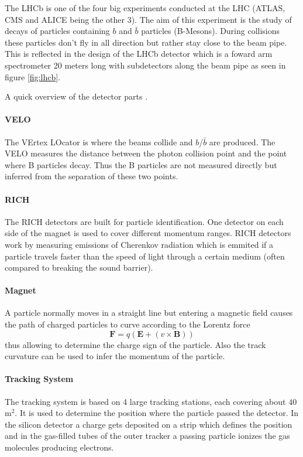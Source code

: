\documentclass[11pt,twoside]{scrreprt}
\begin{document}
The LHCb is one of the four big experiments conducted at the LHC (ATLAS, CMS and ALICE being the other 3). The aim of this experiment is the study of decays of particles containing $b$ and $\bar{b}$ particles (B-Mesons). During collisions these particles don't fly in all direction but rather stay close to the beam pipe. This is reflected in the design of the LHCb detector which is a foward arm spectrometer 20 meters long with subdetectors along the beam pipe as seen in figure \ref{fig:lhcb}.

A quick overview of the detector parts \parencite{lhcbweb}.

\paragraph{VELO} The VErtex LOcator is where the beams collide and $b$/$\bar{b}$ are produced. The VELO measures the distance between the photon collision point and the point where B particles decay. Thus the B particles are not measured directly but inferred from the separation of these two points.

\paragraph{RICH} The RICH detectors are built for particle identification. One detector on each side of the magnet is used to cover different momentum ranges. RICH detectors work by measuring emissions of Cherenkov radiation which is emmited if a particle travels faster than the speed of light through a certain medium (often compared to breaking the sound barrier).

\paragraph{Magnet} A particle normally moves in a straight line but entering a magnetic field causes the path of charged particles to curve according to the Lorentz force \[
  \mathbf{F} = q\left( \mathbf{E} + \left( v\times\mathbf{B}\right)\right)
\]
thus allowing to determine the charge sign of the particle. Also the track curvature can be used to infer the momentum of the particle.

\paragraph{Tracking System} The tracking system is based on 4 large tracking stations, each covering about $40$\,m$^2$. It is used to determine the position where the particle passed the detector. In the silicon detector a charge gets deposited on a strip which defines the position and in the gas-filled tubes of the outer tracker a passing particle ionizes the gas molecules producing electrons.
\end{document}
